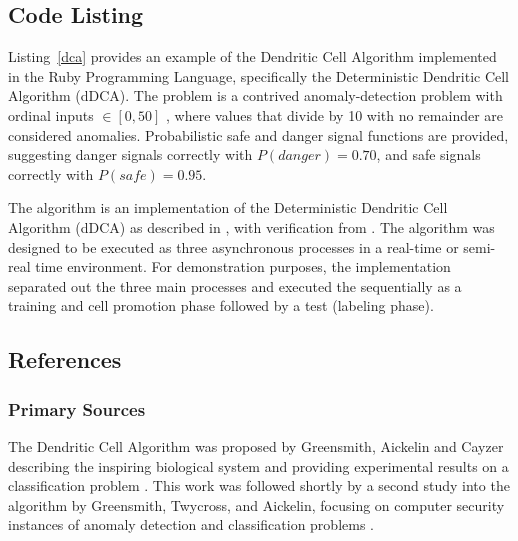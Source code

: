 \subsection{Code Listing}
Listing~\ref{dca} provides an example of the Dendritic Cell Algorithm implemented in the Ruby Programming Language, specifically the Deterministic Dendritic Cell Algorithm (dDCA).
The problem is a contrived anomaly-detection problem with ordinal inputs $\in [0,50]$ , where values that divide by 10 with no remainder are considered anomalies. Probabilistic safe and danger signal functions are provided, suggesting danger signals correctly with $P(danger)=0.70$, and safe signals correctly with $P(safe)=0.95$.

The algorithm is an implementation of the Deterministic Dendritic Cell Algorithm (dDCA) as described in \cite{Stibor2009, Greensmith2008}, with verification from \cite{Greensmith2006a}. The algorithm was designed to be executed as three asynchronous processes in a real-time or semi-real time environment. For demonstration purposes, the implementation separated out the three main processes and executed the sequentially as a training and cell promotion phase followed by a test (labeling phase).



\subsection{References}

% 
% 
\subsubsection{Primary Sources}
The Dendritic Cell Algorithm was proposed by Greensmith, Aickelin and Cayzer describing the inspiring biological system and providing experimental results on a classification problem \cite{Greensmith2005}.
This work was followed shortly by a second study into the algorithm by Greensmith, Twycross, and Aickelin, focusing on computer security instances of anomaly detection and classification problems \cite{Greensmith2006}.

